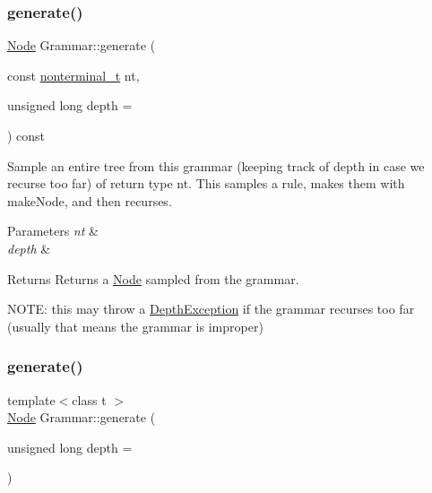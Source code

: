 \subsubsection{\texorpdfstring{generate()}{generate()}\hspace{0.1cm}{\footnotesize\ttfamily [1/2]}}
{\footnotesize\ttfamily \hyperlink{class_node}{Node} Grammar\+::generate (\begin{DoxyParamCaption}\item[{const \hyperlink{_nonterminal_8h_a5c1f658dc7560600a16d22408bd716ca}{nonterminal\+\_\+t}}]{nt,  }\item[{unsigned long}]{depth = {} }\end{DoxyParamCaption}) const\hspace{0.3cm}{\ttfamily [inline]}}

Sample an entire tree from this grammar (keeping track of depth in case we recurse too far) of return type nt. This samples a rule, makes them with make\+Node, and then recurses. 
\begin{DoxyParams}{Parameters}
{\em nt} & \\
\hline
{\em depth} & \\
\hline
\end{DoxyParams}
\begin{DoxyReturn}{Returns}
Returns a \hyperlink{class_node}{Node} sampled from the grammar.
\end{DoxyReturn}
N\+O\+TE\+: this may throw a \hyperlink{class_depth_exception}{Depth\+Exception} if the grammar recurses too far (usually that means the grammar is improper)\mbox{\label{class_grammar_aee4cda199ab92f79b55e73f6cbd90c8b}} 
\subsubsection{\texorpdfstring{generate()}{generate()}\hspace{0.1cm}{\footnotesize\ttfamily [2/2]}}
{\footnotesize\ttfamily template$<$class t $>$ \\
\hyperlink{class_node}{Node} Grammar\+::generate (\begin{DoxyParamCaption}\item[{unsigned long}]{depth = {} }\end{DoxyParamCaption})\hspace{0.3cm}{\ttfamily [inline]}}

